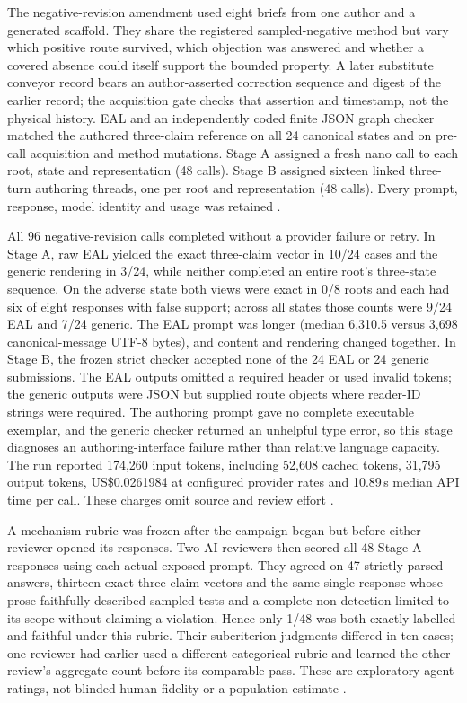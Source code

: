 \documentclass[preprint,12pt]{elsarticle}
\begin{document}
The negative-revision amendment used eight briefs from one author and a generated scaffold. They share the registered sampled-negative method but vary which positive route survived, which objection was answered and whether a covered absence could itself support the bounded property. A later substitute conveyor record bears an author-asserted correction sequence and digest of the earlier record; the acquisition gate checks that assertion and timestamp, not the physical history. EAL and an independently coded finite JSON graph checker matched the authored three-claim reference on all 24 canonical states and on pre-call acquisition and method mutations. Stage A assigned a fresh nano call to each root, state and representation (48 calls). Stage B assigned sixteen linked three-turn authoring threads, one per root and representation (48 calls). Every prompt, response, model identity and usage was retained \citep{earlNeg96}.

All 96 negative-revision calls completed without a provider failure or retry. In Stage A, raw EAL yielded the exact three-claim vector in 10/24 cases and the generic rendering in 3/24, while neither completed an entire root's three-state sequence. On the adverse state both views were exact in 0/8 roots and each had six of eight responses with false support; across all states those counts were 9/24 EAL and 7/24 generic. The EAL prompt was longer (median 6,310.5 versus 3,698 canonical-message UTF-8 bytes), and content and rendering changed together. In Stage B, the frozen strict checker accepted none of the 24 EAL or 24 generic submissions. The EAL outputs omitted a required header or used invalid tokens; the generic outputs were JSON but supplied route objects where reader-ID strings were required. The authoring prompt gave no complete executable exemplar, and the generic checker returned an unhelpful type error, so this stage diagnoses an authoring-interface failure rather than relative language capacity. The run reported 174,260 input tokens, including 52,608 cached tokens, 31,795 output tokens, US\$0.0261984 at configured provider rates and 10.89\,s median API time per call. These charges omit source and review effort \citep{earlNeg96}.

A mechanism rubric was frozen after the campaign began but before either reviewer opened its responses. Two AI reviewers then scored all 48 Stage A responses using each actual exposed prompt. They agreed on 47 strictly parsed answers, thirteen exact three-claim vectors and the same single response whose prose faithfully described sampled tests and a complete non-detection limited to its scope without claiming a violation. Hence only 1/48 was both exactly labelled and faithful under this rubric. Their subcriterion judgments differed in ten cases; one reviewer had earlier used a different categorical rubric and learned the other review's aggregate count before its comparable pass. These are exploratory agent ratings, not blinded human fidelity or a population estimate \citep{earlNeg96Explanation}.
\end{document}
